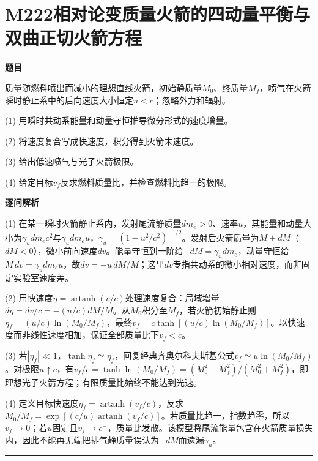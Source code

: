 \documentclass[UTF8,a4paper,11pt,oneside,openany]{ctexbook}
\begin{document}
\section*{M222\quad 相对论变质量火箭的四动量平衡与双曲正切火箭方程}
\textbf{题目}\par
质量随燃料喷出而减小的理想直线火箭，初始静质量$M_0$、终质量$M_f$，喷气在火箭瞬时静止系中的后向速度大小恒定$u<c$；忽略外力和辐射。
\par\smallskip\noindent (1) 用瞬时共动系能量和动量守恒推导微分形式的速度增量。
\par\smallskip\noindent (2) 将速度复合写成快速度，积分得到火箭末速度。
\par\smallskip\noindent (3) 给出低速喷气与光子火箭极限。
\par\smallskip\noindent (4) 给定目标$v_f$反求燃料质量比，并检查燃料比趋一的极限。
\par\medskip\textbf{逐问解析}\par
\par\smallskip\noindent (1) 在某一瞬时火箭静止系内，发射尾流静质量$dm_e>0$、速率$u$，其能量和动量大小为$\gamma_u dm_ec^2$与$\gamma_udm_eu$，$\gamma_u=(1-u^2/c^2)^{-1/2}$。发射后火箭质量为$M+dM$（$dM<0$），微小前向速度$dv$。能量守恒到一阶给$-dM=\gamma_udm_e$，动量守恒给$M\,dv=\gamma_udm_eu$，故$dv=-u\,dM/M$；这里$dv$专指共动系的微小相对速度，而非固定实验室速度差。
\par\smallskip\noindent (2) 用快速度$\eta=\operatorname{artanh}(v/c)$处理速度复合：局域增量$d\eta=dv/c=-(u/c)dM/M$。从$M_0$积分至$M_f$，若火箭初始静止则$\eta_f=(u/c)\ln(M_0/M_f)$，最终$v_f=c\tanh[(u/c)\ln(M_0/M_f)]$。以快速度而非线性速度相加，保证全部质量比下$v_f<c$。
\par\smallskip\noindent (3) 若$|\eta_f|\ll1$，$\tanh\eta_f\simeq\eta_f$，回复经典齐奥尔科夫斯基公式$v_f\simeq u\ln(M_0/M_f)$。对极限$u\uparrow c$，有$v_f/c=\tanh\ln(M_0/M_f)=(M_0^2-M_f^2)/(M_0^2+M_f^2)$，即理想光子火箭方程；有限质量比始终不能达到光速。
\par\smallskip\noindent (4) 定义目标快速度$\eta_f=\operatorname{artanh}(v_f/c)$，反求$M_0/M_f=\exp[(c/u)\operatorname{artanh}(v_f/c)]$。若质量比趋一，指数趋零，所以$v_f\to0$；若$u$固定且$v_f\to c^-$，质量比发散。该模型将尾流能量包含在火箭质量损失内，因此不能再无端把排气静质量误认为$-dM$而遗漏$\gamma_u$。
\par\medskip\hrule\medskip
\end{document}
